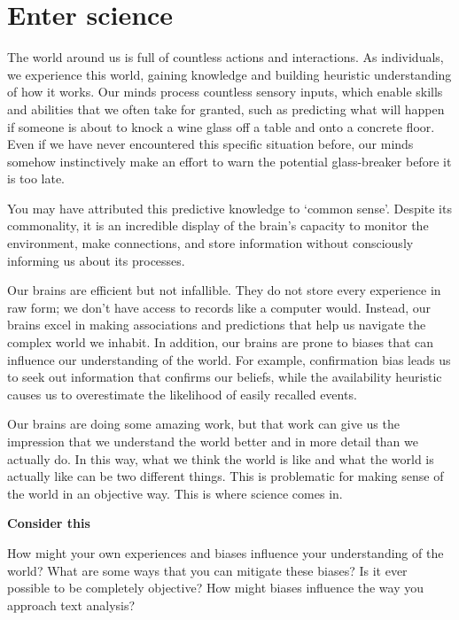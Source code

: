 \documentclass[
  letterpaper,
  krantz1]{latex/krantz-mod}
\theoremstyle{definition}
\theoremstyle{definition}
\theoremstyle{remark}
\begin{document}
\section{Enter science}\label{sec-enter-science}

The world around us is full of countless actions and interactions. As
individuals, we experience this world, gaining knowledge and building
heuristic understanding of how it works. Our minds process countless
sensory inputs, which enable skills and abilities that we often take for
granted, such as predicting what will happen if someone is about to
knock a wine glass off a table and onto a concrete floor. Even if we
have never encountered this specific situation before, our minds somehow
instinctively make an effort to warn the potential glass-breaker before
it is too late.

You may have attributed this predictive knowledge to `common sense'.
Despite its commonality, it is an incredible display of the brain's
capacity to monitor the environment, make connections, and store
information without consciously informing us about its processes.

Our brains are efficient but not infallible. They do not store every
experience in raw form; we don't have access to records like a computer
would. Instead, our brains excel in making associations and predictions
that help us navigate the complex world we inhabit. In addition, our
brains are prone to biases that can influence our understanding of the
world. For example, confirmation bias leads us to seek out information
that confirms our beliefs, while the availability heuristic causes us to
overestimate the likelihood of easily recalled events.

Our brains are doing some amazing work, but that work can give us the
impression that we understand the world better and in more detail than
we actually do. In this way, what we think the world is like and what
the world is actually like can be two different things. This is
problematic for making sense of the world in an objective way. This is
where science comes in.

\begin{tcolorbox}[enhanced jigsaw, toprule=.15mm, breakable, colback=white, arc=.35mm, left=2mm, colframe=quarto-callout-color-frame, opacityback=0, bottomrule=.15mm, rightrule=.15mm, leftrule=.75mm]

\textbf{ Consider this}

How might your own experiences and biases influence your understanding
of the world? What are some ways that you can mitigate these biases? Is
it ever possible to be completely objective? How might biases influence
the way you approach text analysis?

\end{tcolorbox}
\end{document}
